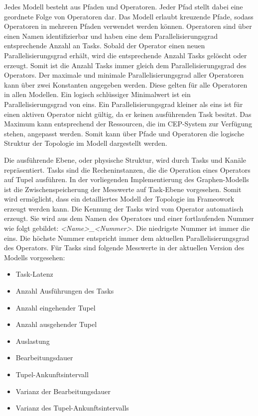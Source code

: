 Jedes Modell besteht aus Pfaden und Operatoren.
Jeder Pfad stellt dabei eine geordnete Folge von Operatoren dar.
Das Modell erlaubt kreuzende Pfade, sodass Operatoren in mehreren Pfaden verwendet werden können.
Operatoren sind über einen Namen identifizierbar und haben eine dem Parallelisierungsgrad entsprechende Anzahl an Tasks.
Sobald der Operator einen neuen Parallelisierungsgrad erhält, wird die entsprechende Anzahl Tasks gelöscht oder erzeugt.
Somit ist die Anzahl Tasks immer gleich dem Parallelisierungsgrad des Operators.
Der maximale und minimale Parallelisierungsgrad aller Operatoren kann über zwei Konstanten angegeben werden. 
Diese gelten für alle Operatoren in allen Modellen. 
Ein logisch schlüssiger Minimalwert ist ein Parallelisierungsgrad von eins.
Ein Parallelisierungsgrad kleiner als eins ist für einen aktiven Operator nicht gültig, da er keinen ausführenden Task besitzt.
Das Maximum kann entsprechend der Ressourcen, die im CEP-System zur Verfügung stehen, angepasst werden.
Somit kann über Pfade und Operatoren die logische Struktur der Topologie im Modell dargestellt werden.

Die ausführende Ebene, oder physische Struktur, wird durch Tasks und Kanäle repräsentiert.
Tasks sind die Recheninstanzen, die die Operation eines Operators auf Tupel ausführen.
In der vorliegenden Implementierung des Graphen-Modells ist die Zwischenspeicherung der Messwerte auf Task-Ebene vorgesehen.
Somit wird ermöglicht, dass ein detailliertes Modell der Topologie im Frameowork erzeugt werden kann.
Die Kennung der Tasks wird vom Operator automatisch erzeugt.
Sie wird aus dem Namen des Operators und einer fortlaufenden Nummer wie folgt gebildet: \textit{<Name>\_<Nummer>}.
Die niedrigste Nummer ist immer die eins.
Die höchste Nummer entspricht immer dem aktuellen Parallelisierungsgrad des Operators.
Für Tasks sind folgende Messwerte in der aktuellen Version des Modells vorgesehen:

\begin{itemize}
\item{Task-Latenz}
\item{Anzahl Ausführungen des Tasks}
\item{Anzahl eingehender Tupel}
\item{Anzahl ausgehender Tupel}
\item{Auslastung}
\item{Bearbeitungsdauer}
\item{Tupel-Ankunftsintervall}
\item{Varianz der Bearbeitungsdauer}
\item{Varianz des Tupel-Ankunftsintervalls}
\end{itemize}

